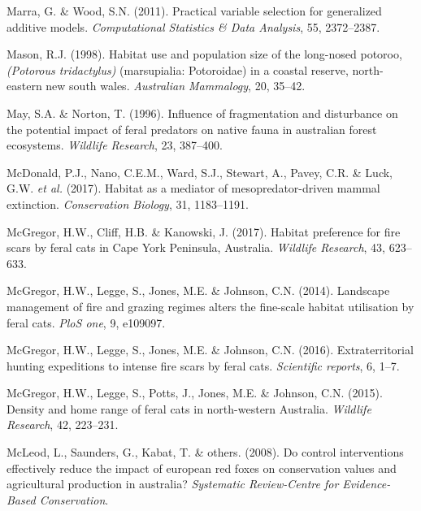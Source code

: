\documentclass[11pt,a4paper,titlepage,twoside,openright]{style/unimelbthesis}
\begin{document}
\begin{mainmatter}
\leavevmode\hypertarget{ref-marra2011practical}{}%
Marra, G. \& Wood, S.N. (2011). Practical variable selection for generalized additive models. \emph{Computational Statistics \& Data Analysis}, 55, 2372--2387.

\leavevmode\hypertarget{ref-mason1998habitat}{}%
Mason, R.J. (1998). Habitat use and population size of the long-nosed potoroo, \emph{(Potorous tridactylus)} (marsupialia: Potoroidae) in a coastal reserve, north-eastern new south wales. \emph{Australian Mammalogy}, 20, 35--42.

\leavevmode\hypertarget{ref-may1996influence}{}%
May, S.A. \& Norton, T. (1996). Influence of fragmentation and disturbance on the potential impact of feral predators on native fauna in australian forest ecosystems. \emph{Wildlife Research}, 23, 387--400.

\leavevmode\hypertarget{ref-mcdonald2017habitat}{}%
McDonald, P.J., Nano, C.E.M., Ward, S.J., Stewart, A., Pavey, C.R. \& Luck, G.W. \emph{et al.} (2017). Habitat as a mediator of mesopredator-driven mammal extinction. \emph{Conservation Biology}, 31, 1183--1191.

\leavevmode\hypertarget{ref-mcgregor2017habitat}{}%
McGregor, H.W., Cliff, H.B. \& Kanowski, J. (2017). Habitat preference for fire scars by feral cats in Cape York Peninsula, Australia. \emph{Wildlife Research}, 43, 623--633.

\leavevmode\hypertarget{ref-mcgregor2014landscape}{}%
McGregor, H.W., Legge, S., Jones, M.E. \& Johnson, C.N. (2014). Landscape management of fire and grazing regimes alters the fine-scale habitat utilisation by feral cats. \emph{PloS one}, 9, e109097.

\leavevmode\hypertarget{ref-mcgregor2016extraterritorial}{}%
McGregor, H.W., Legge, S., Jones, M.E. \& Johnson, C.N. (2016). Extraterritorial hunting expeditions to intense fire scars by feral cats. \emph{Scientific reports}, 6, 1--7.

\leavevmode\hypertarget{ref-mcgregor2015density}{}%
McGregor, H.W., Legge, S., Potts, J., Jones, M.E. \& Johnson, C.N. (2015). Density and home range of feral cats in north-western Australia. \emph{Wildlife Research}, 42, 223--231.

\leavevmode\hypertarget{ref-mcleod2008control}{}%
McLeod, L., Saunders, G., Kabat, T. \& others. (2008). Do control interventions effectively reduce the impact of european red foxes on conservation values and agricultural production in australia? \emph{Systematic Review-Centre for Evidence-Based Conservation}.


\end{mainmatter}
\end{document}
